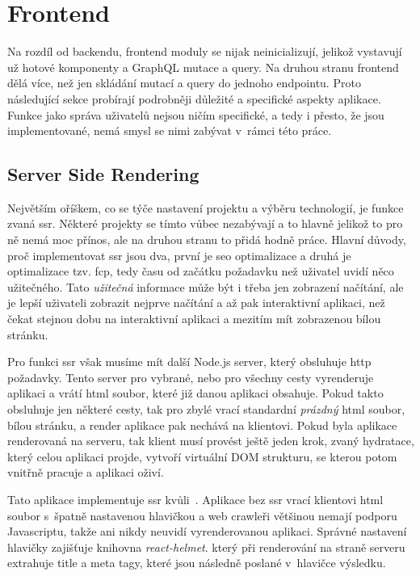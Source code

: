 \section{Frontend}
\label{sc:frontend}
Na rozdíl od backendu, frontend moduly se nijak neinicializují, jelikož vystavují už hotové komponenty a GraphQL mutace a query. Na druhou stranu frontend dělá více, než jen skládání mutací a query do jednoho endpointu. Proto následující sekce probírají podrobněji důležité a specifické aspekty aplikace. Funkce jako správa uživatelů nejsou ničím specifické, a tedy i přesto, že jsou implementované, nemá smysl se nimi zabývat v~rámci této práce.

\subsection{Server Side Rendering}
\label{ss:ssr}
Největším oříškem, co se týče nastavení projektu a výběru technologií, je funkce zvaná \acrfull{ssr}. Některé projekty se tímto vůbec nezabývají a to hlavně jelikož to pro ně nemá moc přínos, ale na druhou stranu to přidá hodně práce. Hlavní důvody, proč implementovat \acrshort{ssr} jsou dva, první je \acrshort{seo} optimalizace a druhá je optimalizace tzv. \acrfull{fcp}, tedy času od začátku požadavku než uživatel uvidí něco užitečného. Tato \emph{užitečná} informace může být i třeba jen zobrazení načítání, ale je lepší uživateli zobrazit nejprve načítání a až pak interaktivní aplikaci, než čekat stejnou dobu na interaktivní aplikaci a mezitím mít zobrazenou bílou stránku.

Pro funkci \acrshort{ssr} však musíme mít další Node.js server, který obsluhuje http požadavky. Tento server pro vybrané, nebo pro všechny cesty vyrenderuje aplikaci a vrátí html soubor, které již danou aplikaci obsahuje. Pokud takto obsluhuje jen některé cesty, tak pro zbylé vrací standardní \emph{prázdný} html soubor, bílou stránku, a render aplikace pak nechává na klientovi. Pokud byla aplikace renderovaná na serveru, tak klient musí provést ještě jeden krok, zvaný hydratace, který celou aplikaci projde, vytvoří virtuální DOM strukturu, se kterou potom vnitřně pracuje a aplikaci oživí.

Tato aplikace implementuje \acrshort{ssr} kvůli~. Aplikace bez \acrshort{ssr} vrací klientovi html soubor s~špatně nastavenou hlavičkou a web crawleři většinou nemají podporu Javascriptu, takže ani nikdy neuvidí vyrenderovanou aplikaci. Správné nastavení hlavičky zajišťuje knihovna \emph{react-helmet}. který při renderování na straně serveru extrahuje title a meta tagy, které jsou následně poslané v~hlavičce výsledku.


